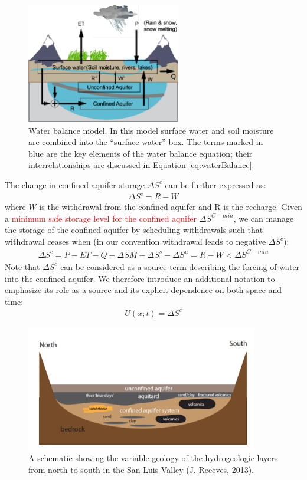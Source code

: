 \begin{figure}
\noindent\includegraphics[width=0.6\textwidth]{Figures/watercycle.pdf}
\caption{Water balance model. In this model surface water and soil moisture are combined into the “surface water” box.  The terms marked in blue are the key elements of the water balance equation; their interrelationships are discussed in Equation \ref{eq:waterBalance}.}
\label{fig:watercycle}
\end{figure}

The change in confined aquifer storage $\Delta S^c$ can be further expressed as:
\begin{align}
\Delta S^c = R - W
\label{eq:confinedStorage}  
\end{align}
where $W$ is the withdrawal from the confined aquifer and R is the recharge. Given a \textcolor{red}{minimum safe storage level for the confined aquifer} $\Delta S^{C-min}$, we can manage the storage of the confined aquifer by scheduling withdrawals such that withdrawal ceases when (in our convention withdrawal leads to negative $\Delta S^c$):
\begin{align}
\Delta S^c = P-ET-Q-\Delta SM - \Delta S^s - \Delta S^u = R-W < \Delta S^{C-min}
\label{eq:safelimit}  
\end{align}
Note that $\Delta S^c$  can be considered as a source term describing the forcing of water into the confined aquifer.  We therefore introduce an additional notation to emphasize its role as a source and its explicit dependence on both space and time:
\begin{align}
U(x;t) = \Delta S^c
\label{eq:force}  
\end{align}

\begin{figure}
\noindent\includegraphics[width=0.9\textwidth]{Figures/SLVaquifers.png}
\caption{A schematic showing the variable geology of the hydrogeologic layers from north to south in the San Luis Valley (J. Reeeves, 2013).}
\label{fig:slv-aquifers}
\end{figure}

